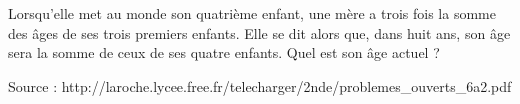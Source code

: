 
Lorsqu'elle met au monde son quatrième enfant, une mère a trois fois la somme des âges de ses trois premiers enfants. Elle se dit alors que, 
dans huit ans, son âge sera la somme de ceux de ses quatre enfants. Quel est son âge actuel ? 

\hfill{{\scriptsize Source : http://laroche.lycee.free.fr/telecharger/2nde/problemes\_ouverts\_6a2.pdf}}